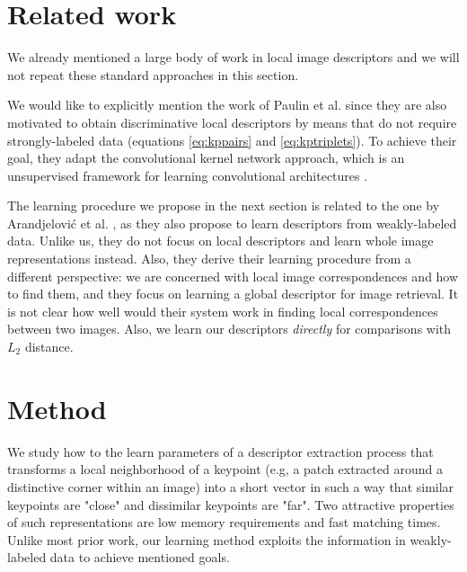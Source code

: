 \documentclass[twocolumn]{article}
\begin{document}
	\section{Related work}
		We already mentioned a large body of work in local image descriptors and we will not repeat these standard approaches in this section.

		We would like to explicitly mention the work of Paulin et al. \cite{kernelconv} since they are also motivated to obtain discriminative local descriptors by means that do not require strongly-labeled data (equations \eqref{eq:kppairs} and \eqref{eq:kptriplets}).
		To achieve their goal, they adapt the convolutional kernel network approach, which is an unsupervised framework for learning convolutional architectures \cite{kernelconv0}.

		The learning procedure we propose in the next section is related to the one by Arandjelovi\'{c} et al. \cite{netvlad}, as they also propose to learn descriptors from weakly-labeled data.
		Unlike us, they do not focus on local descriptors and learn whole image representations instead.
		Also, they derive their learning procedure from a different perspective: we are concerned with local image correspondences and how to find them, and they focus on learning a global descriptor for image retrieval.
		It is not clear how well would their system work in finding local correspondences between two images.
		Also, we learn our descriptors \textit{directly} for comparisons with $L_2$ distance.

	\section{Method}\label{sec:core}
		We study how to the learn parameters of a descriptor extraction process that transforms a local neighborhood of a keypoint (e.g, a patch extracted around a distinctive corner within an image) into a short vector in such a way that similar keypoints are "close" and dissimilar keypoints are "far".
		Two attractive properties of such representations are low memory requirements and fast matching times.
		Unlike most prior work, our learning method exploits the information in weakly-labeled data to achieve mentioned goals.
\end{document}
